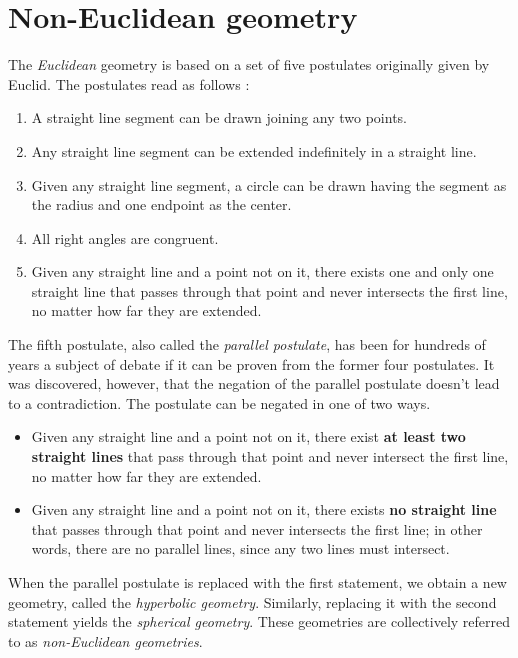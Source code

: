 \section{Non-Euclidean geometry}

The \textit{Euclidean} geometry is based on a set of five postulates originally given by Euclid.
The postulates read as follows \cite{Weisstein-Postulates}:
\begin{enumerate}
    \item A straight line segment can be drawn joining any two points.
    \item Any straight line segment can be extended indefinitely in a straight line.
    \item Given any straight line segment, a circle can be drawn having the segment as the radius and one endpoint as the center.
    \item All right angles are congruent.
    \item Given any straight line and a point not on it, there exists one and only one straight line that passes through that point and never intersects the first line, no matter how far they are extended. \cite{Weisstein-Parallel}
\end{enumerate}
The fifth postulate, also called the \textit{parallel postulate}, has been for hundreds of years a subject of debate if it can be proven from the former four postulates.
It was discovered, however, that the negation of the parallel postulate doesn't lead to a contradiction\cite{Parallel-Postulate}.
The postulate can be negated in one of two ways.
\begin{itemize}
    \item Given any straight line and a point not on it, there exist \textbf{at least two straight lines} that pass through that point and never intersect the first line, no matter how far they are extended.
    \item Given any straight line and a point not on it, there exists \textbf{no straight line} that passes through that point and never intersects the first line; in other words, there are no parallel lines, since any two lines must intersect.
\end{itemize}

When the parallel postulate is replaced with the first statement, we obtain a new geometry, called the \textit{hyperbolic geometry}.
Similarly, replacing it with the second statement yields the \textit{spherical geometry}.
These geometries are collectively referred to as \textit{non-Euclidean geometries}.



